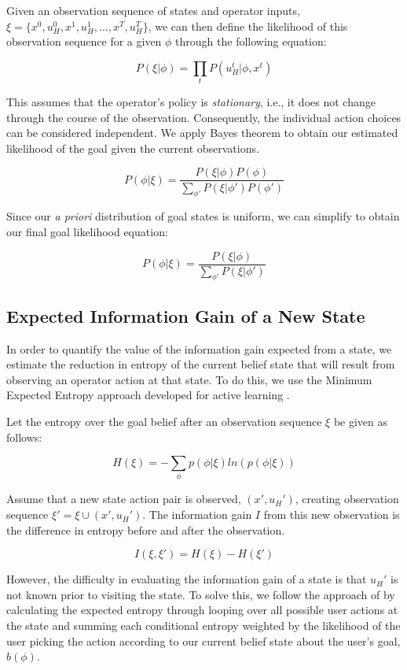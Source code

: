 \documentclass[conference]{IEEEtran}
\begin{document}
Given an observation sequence of states and operator inputs, $\xi = \{x^0, u_H^0, x^1, u_H^1, ..., x^T, u_H^T\}$, we can then define the likelihood of this observation sequence for a given $\phi$ through the following equation:

\[
P(\xi|\phi) = \prod_tP(u_H^t|\phi, x^t)
\]

This assumes that the operator's policy is \textit{stationary}, i.e., it does not change through the course of the observation. Consequently, the individual action choices can be considered independent. We apply Bayes theorem to obtain our estimated likelihood of the goal given the current observations.

\[
P(\phi|\xi) = \frac{P(\xi|\phi)P(\phi)}{\sum_{\phi'}P(\xi|\phi')P(\phi')}
\]

Since our \textit{a priori} distribution of goal states is uniform, we can simplify to obtain our final goal likelihood equation:

\[
P(\phi|\xi) = \frac{P(\xi|\phi)}{\sum_{\phi'}P(\xi|\phi')}
\]

\subsection{Expected Information Gain of a New State}

In order to quantify the value of the information gain expected from a state, we estimate the reduction in entropy of the current belief state that will result from observing an operator action at that state. To do this, we use the Minimum Expected Entropy approach developed for active learning \cite{holub2008entropy}.

Let the entropy over the goal belief after an observation sequence $\xi$ be given as follows:

\[
H(\xi) = -\sum_\phi p(\phi|\xi)ln(p(\phi|\xi))
\]

Assume that a new state action pair is observed, $(x',u_H')$, creating observation sequence $\xi' = \xi \cup (x', u_H')$. The information gain $I$ from this new observation is the difference in entropy before and after the observation.

\[
I(\xi, \xi') = H(\xi) - H(\xi')
\]

However, the difficulty in evaluating the information gain of a state is that $u_H'$ is not known prior to visiting the state. To solve this, we follow the approach of \citet{holub2008entropy} by calculating the expected entropy through looping over all possible user actions at the state and summing each conditional entropy weighted by the likelihood of the user picking the action according to our current belief state about the user's goal, $b(\phi)$.
\end{document}
